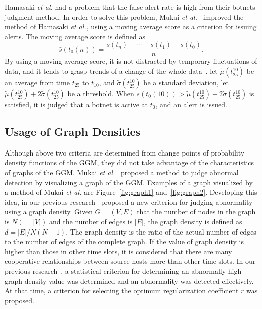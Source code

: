 \documentclass{sig-alternate-10pt}
\begin{document}
Hamasaki {\it et al.} had a problem that the false alert rate is high from their botnets judgment method.
In order to solve this problem, Mukai {\it et al.}~\cite{Mukai1} improved the method of Hamasaki {\it et al.}, using a moving average score as a criterion for issuing alerts.
The moving average score is defined as
\begin{equation*}
\bar{s}(t_{0}(n))=\frac{s(t_{n})+\cdots+s(t_{1})+s(t_{0})}{n}.
\end{equation*}
By using a moving average score, it is not distracted by temporary fluctuations of data, and it tends to grasp trends of a change of the whole data~\cite{Falt}.
let $\tilde{\mu}(t_{25}^{10})$ be an average from time $t_{25}$ to $t_{10}$, and $\tilde{\sigma}(t_{25}^{10})$ be a standard deviation, let $\tilde{\mu}(t_{25}^{10})+2\tilde{\sigma}(t_{25}^{10})$ be a threshold.
When $\bar{s}(t_{0}(10))>\tilde{\mu}(t_{25}^{10})+2\tilde{\sigma}(t_{25}^{10})$ is satisfied, it is judged that a botnet is active at $t_{0}$, and an alert is issued.


\subsection{Usage of Graph Densities}
Although above two criteria are determined from change points of probability density functions of the GGM, they did not take advantage of the characteristics of graphs of the GGM.
Mukai {\it et al.}~\cite{Mukai2} proposed a method to judge abnormal detection by visualizing a graph of the GGM.
Examples of a graph visualized by a method of Mukai {\it et al.} are Figure~\ref{fig:graph1} and~\ref{fig:graph2}.
Developing this idea, in our previous research~\cite{Han} proposed a new criterion for judging abnormality using a graph density.
Given $G=(V,E)$ that the number of nodes in the graph is $N(=|V|)$ and the number of edges is $|E|$, the graph density is defined as $d=|E|/N(N-1)$.
The graph density is the ratio of the actual number of edges to the number of edges of the complete graph.
If the value of graph density is higher than those in other time slots, it is considered that there are many cooperative relationships between source hosts more than other time slots.
In our previous research~\cite{Han}, a statistical criterion for determining an abnormally high graph density value was determined and an abnormality was detected effectively.
At that time, a criterion for selecting the optimum regularization coefficient $r$ was proposed.
\end{document}
